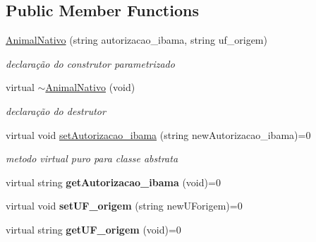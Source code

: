 \subsection*{Public Member Functions}
\begin{DoxyCompactItemize}
\item 
\mbox{\label{class_animal_nativo_af2b29b8e781be4aa0a2da6c16869921a}} 
\mbox{\hyperlink{class_animal_nativo_af2b29b8e781be4aa0a2da6c16869921a}{Animal\+Nativo}} (string autorizacao\+\_\+ibama, string uf\+\_\+origem)
\begin{DoxyCompactList}\small\item\em declaração do construtor parametrizado \end{DoxyCompactList}\item 
\mbox{\label{class_animal_nativo_a6f8f1f7452d0dafe83525d8b53c617b2}} 
virtual \mbox{\hyperlink{class_animal_nativo_a6f8f1f7452d0dafe83525d8b53c617b2}{$\sim$\+Animal\+Nativo}} (void)
\begin{DoxyCompactList}\small\item\em declaração do destrutor \end{DoxyCompactList}\item 
\mbox{\label{class_animal_nativo_a1af7e01f35c5df788dd898136975eb49}} 
virtual void \mbox{\hyperlink{class_animal_nativo_a1af7e01f35c5df788dd898136975eb49}{set\+Autorizacao\+\_\+ibama}} (string new\+Autorizacao\+\_\+ibama)=0
\begin{DoxyCompactList}\small\item\em metodo virtual puro para classe abstrata \end{DoxyCompactList}\item 
\mbox{\label{class_animal_nativo_a9e38c51e12eb4c6f745061b7bdc4483f}} 
virtual string {\bfseries get\+Autorizacao\+\_\+ibama} (void)=0
\item 
\mbox{\label{class_animal_nativo_a73df2a6c415103d1ce2399b02c1a2bb7}} 
virtual void {\bfseries set\+U\+F\+\_\+origem} (string new\+U\+Forigem)=0
\item 
\mbox{\label{class_animal_nativo_a34be8d47e7371e993bd18e10c4824498}} 
virtual string {\bfseries get\+U\+F\+\_\+origem} (void)=0
\end{DoxyCompactItemize}
